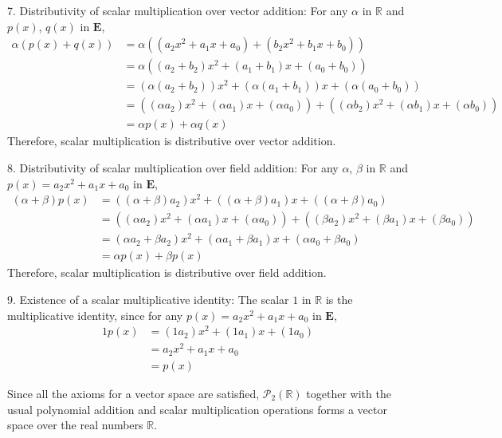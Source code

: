\documentclass{article}
\begin{document}
7. Distributivity of scalar multiplication over vector addition: For any $\alpha$ in $\mathbb{R}$ and $p(x)$, $q(x)$ in $\mathbf{E}$,
\begin{align*}
    \alpha (p(x) + q(x)) & = \alpha ((a_2 x^2 + a_1 x + a_0) + (b_2 x^2 + b_1 x + b_0))                                              \\
                         & = \alpha ((a_2 + b_2) x^2 + (a_1 + b_1) x + (a_0 + b_0))                                                  \\
                         & = (\alpha (a_2 + b_2)) x^2 + (\alpha (a_1 + b_1)) x + (\alpha (a_0 + b_0))                                \\
                         & = ((\alpha a_2) x^2 + (\alpha a_1) x + (\alpha a_0)) + ((\alpha b_2) x^2 + (\alpha b_1) x + (\alpha b_0)) \\
                         & = \alpha p(x) + \alpha q(x)
\end{align*}
Therefore, scalar multiplication is distributive over vector addition.

8. Distributivity of scalar multiplication over field addition: For any $\alpha$, $\beta$ in $\mathbb{R}$ and $p(x) = a_2 x^2 + a_1 x + a_0$ in $\mathbf{E}$,
\begin{align*}
    (\alpha + \beta) p(x) & = ((\alpha + \beta) a_2) x^2 + ((\alpha + \beta) a_1) x + ((\alpha + \beta) a_0)                       \\
                          & = ((\alpha a_2) x^2 + (\alpha a_1) x + (\alpha a_0)) + ((\beta a_2) x^2 + (\beta a_1) x + (\beta a_0)) \\
                          & = (\alpha a_2 + \beta a_2) x^2 + (\alpha a_1 + \beta a_1) x + (\alpha a_0 + \beta a_0)                 \\
                          & = \alpha p(x) + \beta p(x)
\end{align*}
Therefore, scalar multiplication is distributive over field addition.

9. Existence of a scalar multiplicative identity: The scalar $1$ in $\mathbb{R}$ is the multiplicative identity, since for any $p(x) = a_2 x^2 + a_1 x + a_0$ in $\mathbf{E}$,
\begin{align*}
    1 p(x) & = (1 a_2) x^2 + (1 a_1) x + (1 a_0) \\
           & = a_2 x^2 + a_1 x + a_0             \\
           & = p(x)
\end{align*}

Since all the axioms for a vector space are satisfied, $\mathcal{P}_2(\mathbb{R})$ together with the usual polynomial addition and scalar multiplication operations forms a vector space over the real numbers $\mathbb{R}$.
\end{document}
